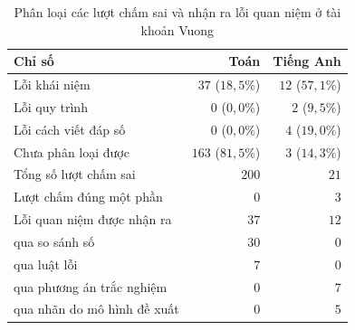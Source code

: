 \begin{table}[H]
\centering
\caption{Phân loại các lượt chấm sai và nhận ra lỗi quan niệm ở tài khoản Vuong}\label{tab:db-grading}
\begin{tabular}{lrr}
\toprule
Chỉ số & Toán & Tiếng Anh \\
\midrule
Lỗi khái niệm & $37$ ($18{,}5$\%) & $12$ ($57{,}1$\%) \\
Lỗi quy trình & $0$ ($0{,}0$\%) & $2$ ($9{,}5$\%) \\
Lỗi cách viết đáp số & $0$ ($0{,}0$\%) & $4$ ($19{,}0$\%) \\
Chưa phân loại được & $163$ ($81{,}5$\%) & $3$ ($14{,}3$\%) \\
\midrule
Tổng số lượt chấm sai & $200$ & $21$ \\
Lượt chấm đúng một phần & $0$ & $3$ \\
Lỗi quan niệm được nhận ra & $37$ & $12$ \\
\quad qua so sánh số & $30$ & $0$ \\
\quad qua luật lỗi & $7$ & $0$ \\
\quad qua phương án trắc nghiệm & $0$ & $7$ \\
\quad qua nhãn do mô hình đề xuất & $0$ & $5$ \\
\bottomrule
\end{tabular}
\end{table}
